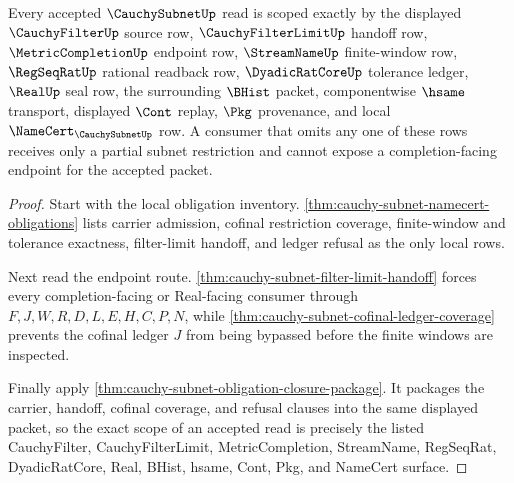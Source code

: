 \begin{theorem}
\label{thm:cauchy-subnet-scoped-route}
Every accepted $\CauchySubnetUp$ read is scoped exactly by the displayed $\CauchyFilterUp$ source row, $\CauchyFilterLimitUp$ handoff row, $\MetricCompletionUp$ endpoint row, $\StreamNameUp$ finite-window row, $\RegSeqRatUp$ rational readback row, $\DyadicRatCoreUp$ tolerance ledger, $\RealUp$ seal row, the surrounding $\BHist$ packet, componentwise $\hsame$ transport, displayed $\Cont$ replay, $\Pkg$ provenance, and local $\NameCert_{\CauchySubnetUp}$ row. A consumer that omits any one of these rows receives only a partial subnet restriction and cannot expose a completion-facing endpoint for the accepted packet.
\end{theorem}
\begin{proof}
Start with the local obligation inventory. \autoref{thm:cauchy-subnet-namecert-obligations} lists carrier admission, cofinal restriction coverage, finite-window and tolerance exactness, filter-limit handoff, and ledger refusal as the only local rows.

Next read the endpoint route. \autoref{thm:cauchy-subnet-filter-limit-handoff} forces every completion-facing or Real-facing consumer through $F,J,W,R,D,L,E,H,C,P,N$, while \autoref{thm:cauchy-subnet-cofinal-ledger-coverage} prevents the cofinal ledger $J$ from being bypassed before the finite windows are inspected.

Finally apply \autoref{thm:cauchy-subnet-obligation-closure-package}. It packages the carrier, handoff, cofinal coverage, and refusal clauses into the same displayed packet, so the exact scope of an accepted read is precisely the listed CauchyFilter, CauchyFilterLimit, MetricCompletion, StreamName, RegSeqRat, DyadicRatCore, Real, BHist, hsame, Cont, Pkg, and NameCert surface.
\end{proof}

